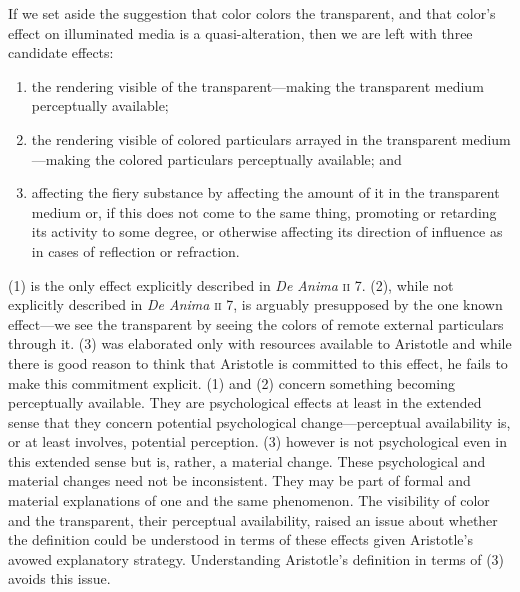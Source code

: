 If we set aside the suggestion that color colors the transparent, and that color's effect on illuminated media is a quasi-alteration, then we are left with three candidate effects:
\begin{enumerate}[(1)]
	\item the rendering visible of the transparent---making the transparent medium perceptually available;
	\item the rendering visible of colored particulars arrayed in the transparent medi\-um\----\-making the colored particulars perceptually available; and 
	\item affecting the fiery substance by affecting the amount of it in the transparent medium or, if this does not come to the same thing, promoting or retarding its activity to some degree, or otherwise affecting its direction of influence as in cases of reflection or refraction. 
\end{enumerate}
(1) is the only effect explicitly described in \emph{De Anima} \textsc{ii} 7. (2), while not explicitly described in \emph{De Anima} \textsc{ii} 7, is arguably presupposed by the one known effect---we see the transparent by seeing the colors of remote external particulars through it. (3) was elaborated only with resources available to Aristotle and while there is good reason to think that Aristotle is committed to this effect, he fails to make this commitment explicit. (1) and (2) concern something becoming perceptually available. They are psychological effects at least in the extended sense that they concern potential psychological change---perceptual availability is, or at least involves, potential perception. (3) however is not psychological even in this extended sense but is, rather, a material change. These psychological and material changes need not be inconsistent. They may be part of formal and material explanations of one and the same phenomenon. The visibility of color and the transparent, their perceptual availability, raised an issue about whether the definition could be understood in terms of these effects given Aristotle's avowed explanatory strategy. Understanding Aristotle's definition in terms of (3) avoids this issue. 

